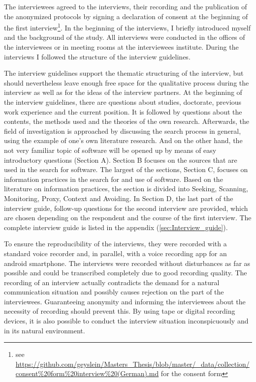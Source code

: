 \documentclass[12pt, a4paper, titlepage, oneside, abstract=true, toc=listof, toc=bibliography, BCOR=1cm]{scrreprt}
\begin{document}
The interviewees agreed to the interviews, their recording and the publication of the anonymized protocols by signing a declaration of consent at the beginning of the first interview\footnote{see \url{https://github.com/geyslein/Masters_Thesis/blob/master/_data/collection/consent\%20form\%20interview\%20(German).md} for the consent form}. In the beginning of the interviews, I briefly introduced myself and the background of the study. All interviews were conducted in the offices of the interviewees or in meeting rooms at the interviewees institute. During the interviews I followed the structure of the interview guidelines.

The interview guidelines support the thematic structuring of the interview, but should nevertheless leave enough free space for the qualitative process during the interview as well as for the ideas of the interview partners. At the beginning of the interview guidelines, there are questions about studies, doctorate, previous work experience and the current position. It is followed by questions about the contents, the methods used and the theories of the own research. Afterwards, the field of investigation is approached by discussing the search process in general, using the example of one's own literature research. And on the other hand, the not very familiar topic of software will be opened up by means of easy introductory questions (Section A).  Section B focuses on the sources that are used in the search for software. The largest of the sections, Section C, focuses on information practices in the search for and use of software. Based on the literature on information practices, the section is divided into Seeking, Scanning, Monitoring, Proxy, Context and Avoiding. In Section D, the last part of the interview guide, follow-up questions for the second interview are provided, which are chosen depending on the respondent and the course of the first interview. The complete interview guide is listed in the appendix (\ref{sec:Interview_guide}).

To ensure the reproducibility of the interviews, they were recorded with a standard voice recorder and, in parallel, with a voice recording app for an android smartphone. The interviews were recorded without disturbances as far as possible and could be transcribed completely due to good recording quality. The recording of an interview actually contradicts the demand for a natural communication situation and possibly causes rejection on the part of the interviewees. Guaranteeing anonymity and informing the interviewees about the necessity of recording should prevent this. By using tape or digital recording devices, it is also possible to conduct the interview situation inconspicuously and in its natural environment.
\end{document}
